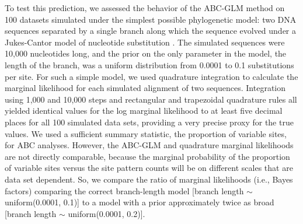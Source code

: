To test this prediction, we assessed the behavior of the ABC-GLM method on
100 datasets simulated under the simplest possible phylogenetic model: two DNA
sequences separated by a single branch along which the sequence evolved under a
Jukes-Cantor model of nucleotide substitution \citep{JC1969}.
The simulated sequences were 10,000 nucleotides long, and the prior on the only
parameter in the model, the length of the branch, was a uniform distribution
from 0.0001 to 0.1 substitutions per site.
For such a simple model, we used quadrature integration to calculate the
marginal likelihood for each simulated alignment of two sequences.
Integration using 1,000 and 10,000 steps and rectangular and trapezoidal
quadrature rules all yielded identical values for the log marginal likelihood
to at least five decimal places for all 100 simulated data sets, providing a
very precise proxy for the true values.
We used a sufficient summary statistic, the proportion of variable sites, for
ABC analyses.
However, the ABC-GLM and quadrature marginal likelihoods are not directly
comparable, because the marginal probability of the proportion of variable
sites versus the site pattern counts will be on different scales that are data
set dependent.
So, we compare the ratio of marginal likelihoods (i.e., Bayes factors)
comparing the correct branch-length model
[branch length $\sim$ uniform(0.0001, 0.1)]
to a model with a prior approximately twice as broad
[branch length $\sim$ uniform(0.0001, 0.2)].

